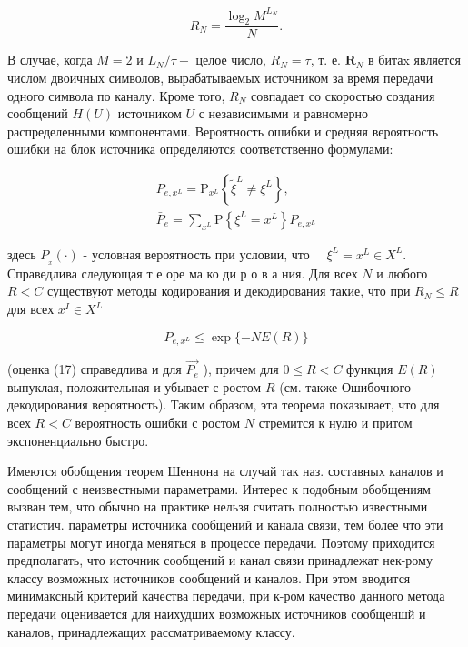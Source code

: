 \documentclass[10pt]{article}
\begin{document}
\[

R_{N}=\frac{\log _{2} M^{L_{N}}}{N} .

\]



В случае, когда $M=2$ и $L_{N} / \tau-$ целое число, $R_{N}=\tau$, т. е. $\boldsymbol{R}_{N}$ в битаx является числом двоичных символов, вырабатываемых источником за время передачи одного символа по каналу. Кроме того, $R_{N}$ совпадает со скоростью создания сообщений $H(U)$ источником $U$ с независимыми и равномерно распределенными компонентами. Вероятность ошибки и средняя вероятность ошибки на блок источника определяются соответственно формулами:



\[

\begin{gathered}

P_{e, x^{L}}=\mathrm{P}_{x^{L}}\left\{\tilde{\xi}^{L} \neq \xi^{L}\right\}, \\

\bar{P}_{e}=\sum_{x^{L}} \mathrm{P}\left\{\xi^{L}=x^{L}\right\} P_{e, x^{L}}

\end{gathered}

\]



здесь $P_{{ }_{x}}(\cdot)$ - условная вероятность при условии, что $\quad \xi^{L}=x^{L} \in X^{L}$. Справедлива следующая т е оре ма ко ди р о в а ния. Для всех $N$ и любого $R<C$ существуют методы кодирования и декодирования такие, что при $R_{N} \leqslant R$ для всех $x^{I} \in X^{L}$



\[

P_{e, x^{L}} \leqslant \exp \{-N E(R)\}

\]



(оценка (17) справедлива и для $\overrightarrow{P_{e}}$ ), причем для $0 \leqslant R<C$ функция $E(R)$ выпуклая, положительная и убывает с ростом $R$ (см. также Ошибочного декодирования вероятность). Таким образом, эта теорема показывает, что для всех $R<C$ вероятность ошибки с ростом $N$ стремится к нулю и притом экспоненциально быстро.



Имеются обобщения теорем Шеннона на случай так наз. составных каналов и сообщений с неизвестными параметрами. Интерес к подобным обобщениям вызван тем, что обычно на практике нельзя считать полностью известными статистич. параметры источника сообщений и канала связи, тем более что эти параметры могут иногда меняться в процессе передачи. Поэтому приходится предполагать, что источник сообщений и канал связи принадлежат нек-рому классу возможных источников сообщений и каналов. При этом вводится минимаксный критерий качества передачи, при к-ром качество данного метода передачи оценивается для наихудших возможных источников сообщеншй и каналов, принадлежащих рассматриваемому классу.
\end{document}
